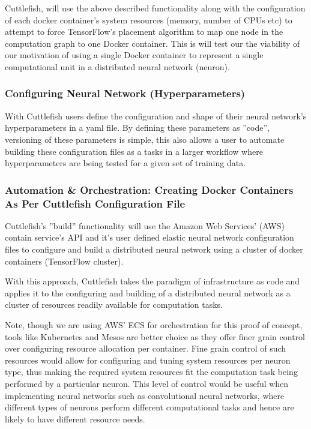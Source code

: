 \documentclass[conference]{IEEEtran}
\begin{document}
Cuttlefish, will use the above described functionality along with the configuration of each docker container's system resources (memory, number of CPUs etc) to attempt to force TensorFlow's placement algorithm to map one node in the computation graph to one Docker container.  This is will test our the viability of our motivation of using a single Docker container to represent a single computational unit in a distributed neural network (neuron).

\subsubsection{Configuring Neural Network (Hyperparameters)}
With Cuttlefish users define the configuration and shape of their neural network's hyperparameters in a yaml file. By defining these parameters as ''code'', versioning of these parameters is simple, this also allows a user to automate building these configuration files as a tasks in a larger workflow where hyperparameters are being tested for a given set of training data.

\subsubsection{Automation \& Orchestration: Creating Docker Containers As Per Cuttlefish Configuration File}
Cuttlefish's ''build'' functionality will use the Amazon Web Services' (AWS) contain service's API \cite{ecs-api} and it's user defined elastic neural network configuration files to configure and build a distributed neural network using a cluster of docker containers (TensorFlow cluster).

With this approach, Cuttlefish takes the paradigm of infrastructure as code and applies it to the configuring and building of a distributed neural network as a cluster of resources readily available for computation tasks.

Note, though we are using AWS' ECS \cite{ecs-doc} for orchestration for this proof of concept, tools like Kubernetes and Mesos are better choice as they offer finer grain control over configuring resource allocation per container. Fine grain control of such resources would allow for configuring and tuning system resources per neuron type, thus making the required system resources fit the computation task being performed by a particular neuron. This level of control would be useful when implementing neural networks such as convolutional neural networks, where different types of neurons perform different computational tasks and hence are likely to have different resource needs.
\end{document}
